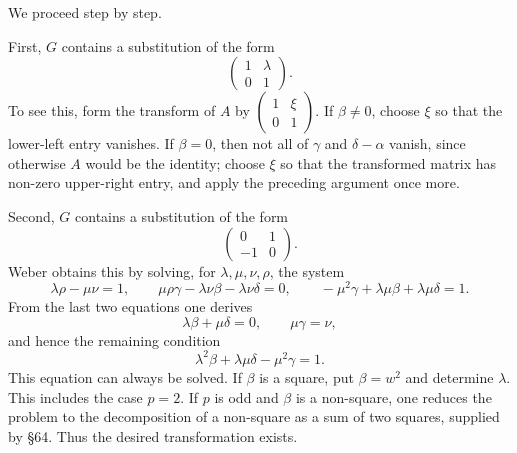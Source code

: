 \documentclass[11pt]{article}
\begin{document}
We proceed step by step.

First, \(G\) contains a substitution of the form
\begin{equation}\label{eq:66-3}
 \begin{pmatrix}1&\lambda\\0&1\end{pmatrix}.
\end{equation}
To see this, form the transform of \(A\) by \(\begin{pmatrix}1&\xi\\0&1\end{pmatrix}\).  If \(\beta\ne0\), choose \(\xi\) so that the lower-left entry vanishes.  If \(\beta=0\), then not all of \(\gamma\) and \(\delta-\alpha\) vanish, since otherwise \(A\) would be the identity; choose \(\xi\) so that the transformed matrix has non-zero upper-right entry, and apply the preceding argument once more.

Second, \(G\) contains a substitution of the form
\begin{equation}\label{eq:66-5}
 \begin{pmatrix}0&1\\-1&0\end{pmatrix}.
\end{equation}
Weber obtains this by solving, for \(\lambda,\mu,\nu,\rho\), the system
\begin{equation}\label{eq:66-6}
 \lambda\rho-\mu\nu=1,
 \qquad \mu\rho\gamma-\lambda\nu\beta-\lambda\nu\delta=0,
 \qquad -\mu^2\gamma+\lambda\mu\beta+\lambda\mu\delta=1.
\end{equation}
From the last two equations one derives
\begin{equation}\label{eq:66-7}
 \lambda\beta+\mu\delta=0,
 \qquad \mu\gamma=\nu,
\end{equation}
and hence the remaining condition
\begin{equation}\label{eq:66-8}
 \lambda^2\beta+\lambda\mu\delta-\mu^2\gamma=1.
\end{equation}
This equation can always be solved.  If \(\beta\) is a square, put \(\beta=w^2\) and determine \(\lambda\).  This includes the case \(p=2\).  If \(p\) is odd and \(\beta\) is a non-square, one reduces the problem to the decomposition of a non-square as a sum of two squares, supplied by \S 64.  Thus the desired transformation exists.
\end{document}
